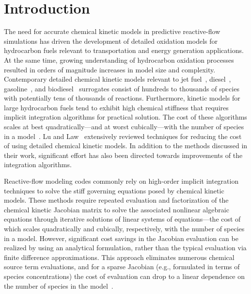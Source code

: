 \documentclass[preprint,review,11pt]{elsarticle}
\begin{document}
\clearpage

\section{Introduction}
\label{sec:Intro}

The need for accurate chemical kinetic models in predictive reactive-flow simulations has driven the development of detailed oxidation models for hydrocarbon fuels relevant to transportation and energy generation applications.
At the same time, growing understanding of hydrocarbon oxidation processes resulted in orders of magnitude increases in model size and complexity.
Contemporary detailed chemical kinetic models relevant to jet fuel~\cite{Naik2011434}, diesel~\cite{Sarathy:2011kx}, gasoline~\cite{Mehl:2011jn}, and biodiesel~\cite{Herbinet:2010gu} surrogates consist of hundreds to thousands of species with potentially tens of thousands of reactions.
Furthermore, kinetic models for large hydrocarbon fuels tend to exhibit high chemical stiffness that requires implicit integration algorithms for practical solution.
The cost of these algorithms scales at best quadratically---and at worst cubically---with the number of species in a model~\cite{Lu:2009gh}.
Lu and Law~\cite{Lu:2009gh} extensively reviewed techniques for reducing the cost of using detailed chemical kinetic models.
In addition to the methods discussed in their work, significant effort has also been directed towards improvements of the integration algorithms.

Reactive-flow modeling codes commonly rely on high-order implicit integration techniques to solve the stiff governing equations posed by chemical kinetic models.
These methods require repeated evaluation and factorization of the chemical kinetic Jacobian matrix to solve the associated nonlinear algebraic equations through iterative solutions of linear systems of equations---the cost of which scales quadratically and cubically, respectively, with the number of species in a model.
However, significant cost savings in the Jacobian evaluation can be realized by using an analytical formulation, rather than the typical evaluation via finite difference approximations.
This approach eliminates numerous chemical source term evaluations, and for a sparse Jacobian (e.g., formulated in terms of species concentrations) the cost of evaluation can drop to a linear dependence on the number of species in the model~\cite{Lu:2009gh}.
\end{document}

